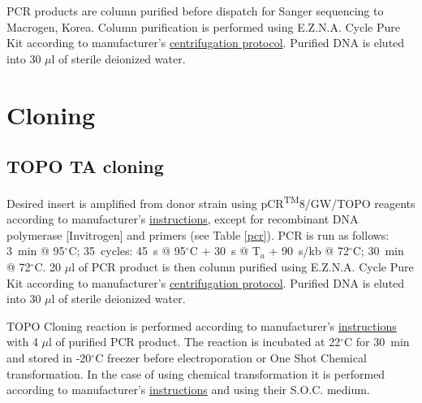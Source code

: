 PCR products are column purified before dispatch for Sanger sequencing to Macrogen, Korea.
Column purification is performed using E.Z.N.A.\textsuperscript{\textregistered} Cycle Pure Kit according to manufacturer's \href{http://omegabiotek.com/store/wp-content/uploads/2013/09/D6492_D6493-Cycle-Pure-Kit-Combo-Online.pdf}{centrifugation protocol}.
Purified DNA is eluted into 30 $\mu$l of sterile deionized water.

\section{Cloning}
\subsection{TOPO TA cloning}
Desired insert is amplified from donor strain using pCR\textsuperscript{TM}8/GW/TOPO\textsuperscript{\textregistered} reagents according to manufacturer's \href{https://assets.thermofisher.com/TFS-Assets/LSG/manuals/pcr8gwtopo_man.pdf}{instructions}, except for recombinant  DNA polymerase [Invitrogen] and primers (see Table \ref{pcr}).
PCR is run as follows: 3~min @ 95$^{\circ}$C; 35~cycles: 45~s @ 95$^{\circ}$C + 30~s @ T$_{a}$ + 90~s/kb @ 72$^{\circ}$C; 30~min @ 72$^{\circ}$C.
20 $\mu$l of PCR product is then column purified using E.Z.N.A.\textsuperscript{\textregistered} Cycle Pure Kit according to manufacturer's \href{http://omegabiotek.com/store/wp-content/uploads/2013/09/D6492_D6493-Cycle-Pure-Kit-Combo-Online.pdf}{centrifugation protocol}.
Purified DNA is eluted into 30 $\mu$l of sterile deionized water.

TOPO\textsuperscript{\textregistered} Cloning reaction is performed according to manufacturer's \href{https://assets.thermofisher.com/TFS-Assets/LSG/manuals/pcr8gwtopo_man.pdf}{instructions} with 4 $\mu$l of purified PCR product.
The reaction is incubated at 22$^{\circ}$C for 30~min and stored in -20$^{\circ}$C freezer before electroporation or One Shot\textsuperscript{\textregistered} Chemical transformation.
In the case of using chemical transformation it is performed according to manufacturer's \href{https://assets.thermofisher.com/TFS-Assets/LSG/manuals/pcr8gwtopo_man.pdf}{instructions} and using their S.O.C. medium.


